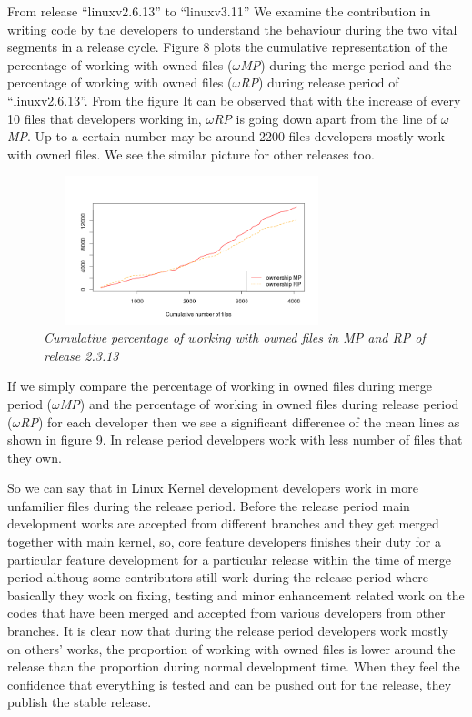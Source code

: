 \documentclass{acm_proc_article-sp}
\begin{document}
From release ``linuxv2.6.13'' to ``linuxv3.11'' We examine the contribution in writing code by the developers to understand the behaviour during the two vital segments in a release cycle. Figure 8 plots the cumulative representation of the percentage of working with owned files ($\omega$\textit{MP}) during the merge period and the percentage of working with owned files ($\omega$\textit{RP}) during release period of ``linuxv2.6.13''. From the figure It can be observed that with the increase of every 10 files that developers working in, $\omega$\textit{RP} is going down apart from the line of $\omega$\textit{MP}. Up to a certain number may be around 2200 files developers mostly work with owned files. We see the similar picture for other releases too.
\begin{figure}
\begin{center}
\includegraphics[height=1.7in,width=3.4in]{cumulFileOwnP.png}
\caption{\small \sl Cumulative percentage of working with owned files in MP and RP of release 2.3.13}
\end{center}
\end{figure}

If we simply compare the percentage of working in owned files during merge period ($\omega$\textit{MP}) and the percentage of working in owned files during release period ($\omega$\textit{RP}) for each developer then we see a significant difference of the mean lines as shown in figure 9. In release period developers work with less number of files that they own.

So we can say that in Linux Kernel development developers work in more unfamilier files during the release period. Before the release period main development works are accepted from different branches and they get merged together with main kernel, so, core feature developers finishes their duty for a particular feature development for a particular release within the time of merge period althoug some contributors still work during the release period where basically they work on fixing, testing and minor enhancement related work on the codes that have been merged and accepted from various developers from other branches. It is clear now that during the release period developers work mostly on others' works, the proportion of working with owned files is lower around the release than the proportion during normal development time. When they feel the confidence that everything is tested and can be pushed out for the release, they publish the stable release.
\end{document}
